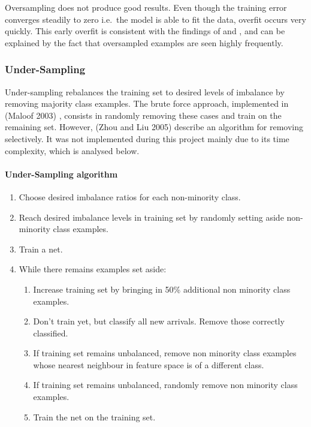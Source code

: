 \documentclass[a4paper,11pt]{article}
\begin{document}
Oversampling does not produce good results. Even though the training error converges steadily to zero i.e.\ the model is able to fit the data, overfit occurs very quickly. This early overfit is consistent with the findings of \cite{zhou} and \cite{maloof}, and can be explained by the fact that oversampled examples are seen highly frequently. 
%
%
%
%


\subsubsection{Under-Sampling}

Under-sampling rebalances the training set to desired levels of imbalance by removing majority class examples. The brute force approach, implemented in (Maloof 2003) \cite{maloof}, consists in randomly removing these cases and train on the remaining set. However, (Zhou and Liu 2005) \cite{zhou} describe an algorithm for removing selectively. It was not implemented during this project mainly due to its time complexity, which is analysed below. 

\paragraph{Under-Sampling algorithm}
\begin{enumerate}
\item Choose desired imbalance ratios for each non-minority class.
\item Reach desired imbalance levels in training set by randomly setting aside non-minority class examples.
\item Train a net.
\item While there remains examples set aside:
	\begin{enumerate}
	\item Increase training set by bringing in 50\% additional non minority class examples.
	\item Don't train yet, but classify all new arrivals. Remove those correctly classified.
	\item If training set remains unbalanced, remove non minority class examples whose nearest neighbour in feature space is of a different class.
	\item If training set remains unbalanced, randomly remove non minority class examples.
	\item Train the net on the training set.
	\end{enumerate}
\end{enumerate} 
\end{document}
